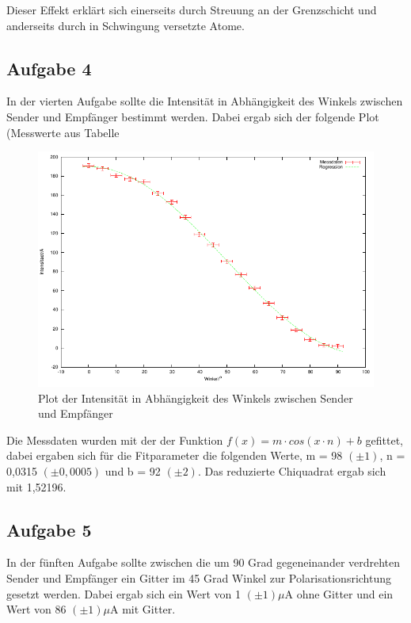 \documentclass[12pt]{scrartcl}
\begin{document}
Dieser Effekt erklärt sich einerseits durch Streuung an der Grenzschicht und anderseits durch in Schwingung versetzte Atome.

\subsection{Aufgabe 4}
In der vierten Aufgabe sollte die Intensität in Abhängigkeit des Winkels zwischen Sender und Empfänger bestimmt werden. Dabei ergab sich der folgende Plot (Messwerte aus Tabelle %

\begin{figure}[H]
\centering
    \includegraphics[scale = 1]{a_4.pdf}
  	\caption[Plot der Intensität in Abhängigkeit des Winkels zwischen Sender und Empfänger]{Plot der Intensität in Abhängigkeit des Winkels zwischen Sender und Empfänger}
  \label{fig:a_4}
\end{figure}

Die Messdaten wurden mit der der Funktion $ f(x) = m \cdot cos(x \cdot n) + b$ gefittet, dabei ergaben sich für die Fitparameter die folgenden Werte, m = 98 $(\pm 1)$, n = 0,0315 $(\pm 0,0005)$ und b = 92 $(\pm 2)$. Das reduzierte Chiquadrat ergab sich mit 1,52196.

\subsection{Aufgabe 5}
In der fünften Aufgabe sollte zwischen die um 90 Grad gegeneinander verdrehten Sender und Empfänger ein Gitter im 45 Grad Winkel zur Polarisationsrichtung gesetzt werden. Dabei ergab sich ein Wert von 1 $(\pm 1) \mu$A ohne Gitter und ein Wert von 86 $(\pm 1) \mu$A mit Gitter.
\end{document}
